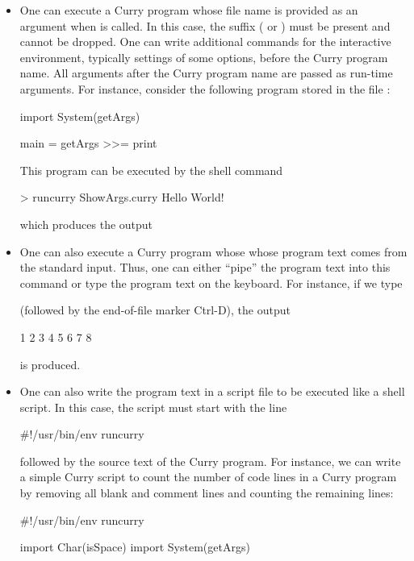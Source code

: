 \begin{itemize}
\item
One can execute a Curry program whose file name
is provided as an argument when  is called.
In this case, the suffix ( or )
must be present and cannot be dropped.
One can write additional commands for the interactive environment,
typically settings of some options, before the Curry program name.
All arguments after the Curry program name are passed as run-time
arguments. For instance, consider the following program stored
in the file :
\begin{curry}
import System(getArgs)

main = getArgs >>= print
\end{curry}
This program can be executed by the shell command
\begin{curry}
> runcurry ShowArgs.curry Hello World!
\end{curry}
which produces the output
\begin{curry}
\end{curry}

\item
One can also execute a Curry program whose whose program text
comes from the standard input. Thus, one can either ``pipe''
the program text into this command or type the program text on
the keyboard. For instance, if we type
(followed by the end-of-file marker Ctrl-D), the output
\begin{curry}
1
2
3
4
5
6
7
8
\end{curry}
is produced.

\item
One can also write the program text in a script file to be executed
like a shell script. In this case, the script must start with the line
\begin{curry}
#!/usr/bin/env runcurry
\end{curry}
followed by the source text of the Curry program.
For instance, we can write a simple Curry script to count the
number of code lines in a Curry program by removing all blank
and comment lines and counting the remaining lines:
\begin{currynomath}
#!/usr/bin/env runcurry

import Char(isSpace)
import System(getArgs)


\end{currynomath}
\end{itemize}
